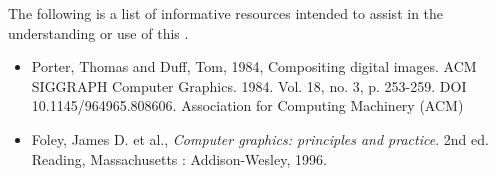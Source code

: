 
\pnum
The following is a list of informative resources intended to assist in the understanding or use of this \documenttypename.

\begin{itemize}
\item Porter, Thomas and Duff, Tom, 1984, Compositing digital images. ACM SIGGRAPH Computer Graphics. 1984. Vol. 18, no. 3, p. 253-259. DOI 10.1145/964965.808606. Association for Computing Machinery (ACM)
\item Foley, James D. et al., \textit{Computer graphics: principles and practice}. 2nd ed. Reading, Massachusetts : Addison-Wesley, 1996.
\end{itemize}
